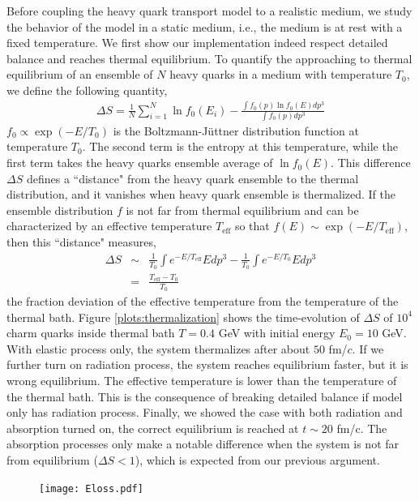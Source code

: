 \documentclass[aps, prc, reprint, amsmath, groupedaddress, nofootinbib]{revtex4-1}
\begin{document}
Before coupling the heavy quark transport model to a realistic medium, we study the behavior of the model in a static medium, i.e., the medium is at rest with a fixed temperature.
We first show our implementation indeed respect detailed balance and reaches thermal equilibrium.
To quantify the approaching to thermal equilibrium of an ensemble of $N$ heavy quarks in a medium with temperature $T_0$, we define the following quantity,
\begin{eqnarray}
\Delta S = \frac{1}{N}\sum_{i=1}^{N} \ln f_0(E_i) - \frac{\int f_0(p)\ln f_0(E) dp^3}{\int f_0(p) dp^3}
\end{eqnarray}
$f_0 \propto \exp(-E/T_0)$ is the Boltzmann-J\"uttner distribution function at temperature $T_0$. 
The second term is the entropy at this temperature, while the first term takes the heavy quarks ensemble average of $\ln f_0(E)$.
This difference $\Delta S$ defines a ``distance" from the heavy quark ensemble to the thermal distribution, and it vanishes when heavy quark ensemble is thermalized.
If the ensemble distribution $f$ is not far from thermal equilibrium and can be characterized by an effective temperature $T_{\textrm{eff}}$ so that $f(E)\sim \exp(-E/T_{\textrm{eff}})$, then this ``distance" measures,
\begin{eqnarray}
\nonumber
\Delta S &\sim& \frac{1}{T_0}\int  e^{-E/T_{\textrm{eff}}} E dp^3 - \frac{1}{T_0}\int e^{-E/T_0} E dp^3 \\
&=& \frac{T_\textrm{eff}-T_0}{T_0}
\end{eqnarray}
the fraction deviation of the effective temperature from the temperature of the thermal bath.
Figure \ref{plots:thermalization} shows the time-evolution of $\Delta S$ of $10^4$ charm quarks inside thermal bath $T=0.4$ GeV with initial energy $E_0 = 10$ GeV.
With elastic process only, the system thermalizes after about $50$ fm/$c$.
If we further turn on radiation process, the system reaches equilibrium faster, but it is wrong equilibrium.
The effective temperature is lower than the temperature of the thermal bath.
This is the consequence of breaking detailed balance if model only has radiation process.
Finally, we showed the case with both radiation and absorption turned on, the correct equilibrium is reached at $t\sim 20$ fm/c.
The absorption processes only make a notable difference when the system is not far from equilibrium ($\Delta S < 1$), which is expected from our previous argument.
\begin{figure}
\texttt{[image: Eloss.pdf]}
\caption{}\label{plots:dEE}
\end{figure}
\end{document}
